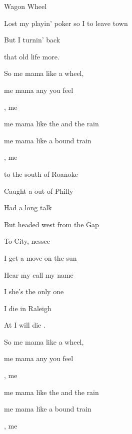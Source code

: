 \begin{SBSong}{Wagon Wheel}
\begin{SBVerse}
    Lost my  playin' poker so I  to leave town
    
    But I  turnin' back
    
     that old life  more.
  \end{SBVerse} 
  \begin{SBChorus}  
    So  me mama like a  wheel,
    
     me mama any you feel
    
    ,   me
    
     me mama like the  and the rain
    
     me mama like a bound train
    
    ,   me

  \end{SBChorus} 
  
  \begin{SBVerse}  
     to the south  of Roanoke
    
    Caught a  out of Philly
    
    Had a  long talk
    
    But  headed west from the  Gap
    
    To  City, nessee
  \end{SBVerse} 
  \begin{SBVerse}   
    I  get a move on  the sun
    
    Hear my  call my name
    
    I  she's the only one
    
     I die in Raleigh
    
    At  I will die .
  \end{SBVerse} 
  \begin{SBChorus}   
    So  me mama like a  wheel,
    
     me mama any  you feel
    
    ,   me
    
     me mama like the  and the rain
    
     me mama like a bound train
    
    ,   me 
    
  \end{SBChorus}
\end{SBSong}
